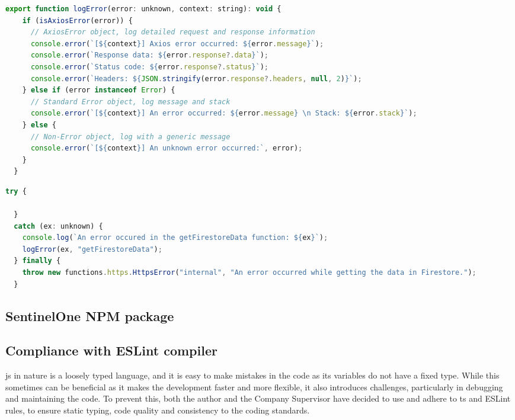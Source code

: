 \begin{lstlisting}[language=JavaScript, caption=LogError functionality in the Utilities folder]
  export function logError(error: unknown, context: string): void {
    if (isAxiosError(error)) {
      // AxiosError object, log detailed request and response information
      console.error(`[${context}] Axios error occurred: ${error.message}`);
      console.error(`Response data: ${error.response?.data}`);
      console.error(`Status code: ${error.response?.status}`);
      console.error(`Headers: ${JSON.stringify(error.response?.headers, null, 2)}`);
    } else if (error instanceof Error) {
      // Standard Error object, log message and stack
      console.error(`[${context}] An error occurred: ${error.message} \n Stack: ${error.stack}`);
    } else {
      // Non-Error object, log with a generic message
      console.error(`[${context}] An unknown error occurred:`, error);
    }
  }
\end{lstlisting}


\begin{lstlisting}[language=JavaScript, caption={An example of how that utility is used in the Cloud Function, the reasong why exception type is unknown is to comply with the ESLint rules that does not recommend to use the any type to the variables}]
  try {

  }
  catch (ex: unknown) {
    console.log(`An error occured in the getFirestoreData function: ${ex}`);
    logError(ex, "getFirestoreData");
  } finally {
    throw new functions.https.HttpsError("internal", "An error occurred while getting the data in Firestore.");
  }
\end{lstlisting}

\begin{multicols}{2}
  \subsection{SentinelOne NPM package}

  \subsection{Compliance with ESLint compiler}
  \acrshort{js} in nature is a loosely typed language, and it is easy to make mistakes in the code as its variables do not have a fixed type. While this sometimes can be
  beneficial as it makes the development faster and more flexible, it also introduces challenges, particularly in debugging and maintaining the code. To prevent this,
  both the author and the Company Supervisor have decided to use and adhere to \acrshort{ts} and ESLint rules, to ensure static typing, code quality
  and consistency to the coding standards.
\end{multicols}


